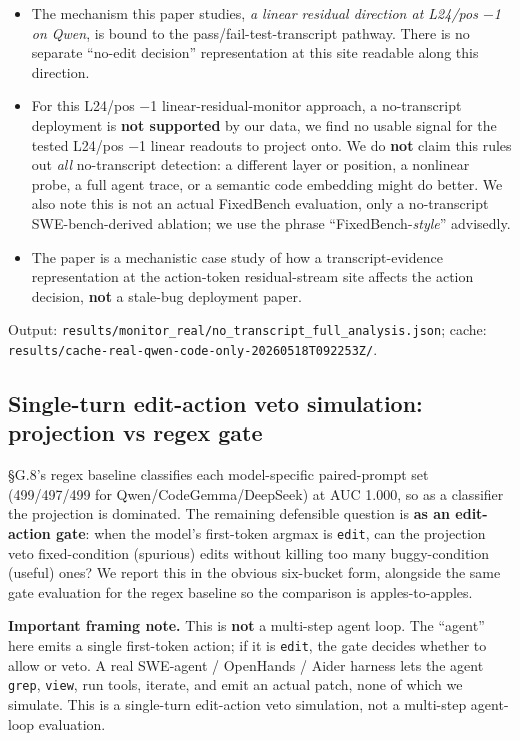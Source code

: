 \documentclass[
  11pt,
  a4paper]{article}
\newcounter{none} %
\providecommand{\tightlist}{%
  \setlength{\itemsep}{0pt}\setlength{\parskip}{0pt}}
\begin{document}
\begin{itemize}
\tightlist
\item
  The mechanism this paper studies, \emph{a linear residual direction at
  L24/pos \ensuremath{-}1 on Qwen}, is bound to the pass/fail-test-transcript
  pathway. There is no separate ``no-edit decision'' representation at
  this site readable along this direction.
\item
  For this L24/pos \ensuremath{-}1 linear-residual-monitor approach, a no-transcript
  deployment is \textbf{not supported} by our data, we find no usable
  signal for the tested L24/pos \ensuremath{-}1 linear readouts to project onto. We
  do \textbf{not} claim this rules out \emph{all} no-transcript
  detection: a different layer or position, a nonlinear probe, a full
  agent trace, or a semantic code embedding might do better. We also
  note this is not an actual FixedBench evaluation, only a no-transcript
  SWE-bench-derived ablation; we use the phrase
  ``FixedBench-\emph{style}'' advisedly.
\item
  The paper is a mechanistic case study of how a transcript-evidence
  representation at the action-token residual-stream site affects the
  action decision, \textbf{not} a stale-bug deployment paper.
\end{itemize}

Output:
\texttt{results/monitor\_real/no\_transcript\_full\_analysis.json};
cache:
\texttt{results/}\allowbreak\texttt{cache-real-qwen-code-only-}\allowbreak\texttt{20260518T092253Z/}.

\subsection{Single-turn edit-action veto simulation: projection vs regex
gate}\label{single-turn-edit-action-veto-simulation-projection-vs-regex-gate}

\S{}G.8's regex baseline classifies each model-specific paired-prompt set
(499/497/499 for Qwen/CodeGemma/DeepSeek) at AUC 1.000, so as a
classifier the projection is dominated. The remaining defensible
question is \textbf{as an edit-action gate}: when the model's
first-token argmax is \texttt{edit}, can the projection veto
fixed-condition (spurious) edits without killing too many
buggy-condition (useful) ones? We report this in the obvious six-bucket
form, alongside the same gate evaluation for the regex baseline so the
comparison is apples-to-apples.

\textbf{Important framing note.} This is \textbf{not} a multi-step agent
loop. The ``agent'' here emits a single first-token action; if it is
\texttt{edit}, the gate decides whether to allow or veto. A real
SWE-agent / OpenHands / Aider harness lets the agent \texttt{grep},
\texttt{view}, run tools, iterate, and emit an actual patch, none of
which we simulate. This is a single-turn edit-action veto simulation,
not a multi-step agent-loop evaluation.
\end{document}
